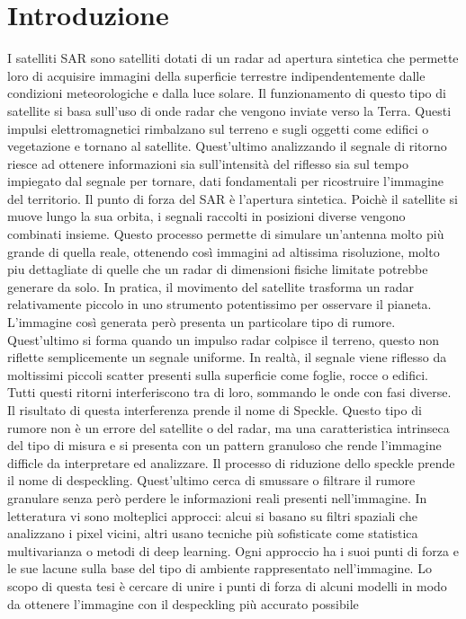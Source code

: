 
\chapter{Introduzione}

I satelliti SAR sono satelliti dotati di un radar ad apertura sintetica che permette loro di
acquisire immagini della superficie terrestre indipendentemente dalle condizioni meteorologiche 
e dalla luce solare. Il funzionamento di questo tipo di satellite si basa sull'uso di  onde radar 
che vengono inviate verso la Terra. Questi impulsi elettromagnetici rimbalzano sul terreno e sugli 
oggetti come edifici o vegetazione e tornano al satellite. Quest'ultimo analizzando il segnale di 
ritorno riesce ad ottenere informazioni sia sull'intensità del riflesso sia sul tempo impiegato 
dal segnale per tornare, dati fondamentali per ricostruire l'immagine del territorio. Il punto 
di forza del SAR è l'apertura sintetica. Poichè il satellite si muove lungo la sua orbita, i 
segnali raccolti in posizioni diverse vengono combinati insieme. Questo processo permette di 
simulare un'antenna molto più grande di quella reale, ottenendo così immagini ad altissima 
risoluzione, molto piu dettagliate di quelle che un radar di dimensioni fisiche limitate potrebbe 
generare da solo. In pratica, il movimento del satellite trasforma un radar relativamente piccolo 
in uno strumento potentissimo per osservare il pianeta. L'immagine così generata però presenta un 
particolare tipo di rumore. Quest'ultimo si forma quando un impulso radar colpisce il terreno, 
questo non riflette semplicemente un segnale uniforme. In realtà, il segnale viene riflesso da 
moltissimi piccoli scatter presenti sulla superficie come foglie, rocce o edifici. Tutti questi 
ritorni interferiscono tra di loro, sommando le onde con fasi diverse. Il risultato di questa 
interferenza prende il nome di Speckle. Questo tipo di rumore non è un errore del satellite o 
del radar, ma una caratteristica intrinseca del tipo di misura e si presenta con un pattern granuloso
che rende l'immagine difficle da interpretare ed analizzare. Il processo di riduzione dello speckle 
prende il nome di despeckling. Quest'ultimo cerca di smussare o filtrare il rumore granulare senza 
però perdere le informazioni reali presenti nell'immagine. In letteratura vi sono molteplici 
approcci: alcui si basano su filtri spaziali che analizzano i pixel vicini, altri usano tecniche 
più sofisticate come statistica multivarianza o metodi di deep learning. Ogni approccio ha i suoi
punti di forza e le sue lacune sulla base del tipo di ambiente rappresentato nell'immagine. Lo scopo
di questa tesi è cercare di unire i punti di forza di alcuni modelli in modo da ottenere l'immagine 
con il despeckling più accurato possibile
\medskip

